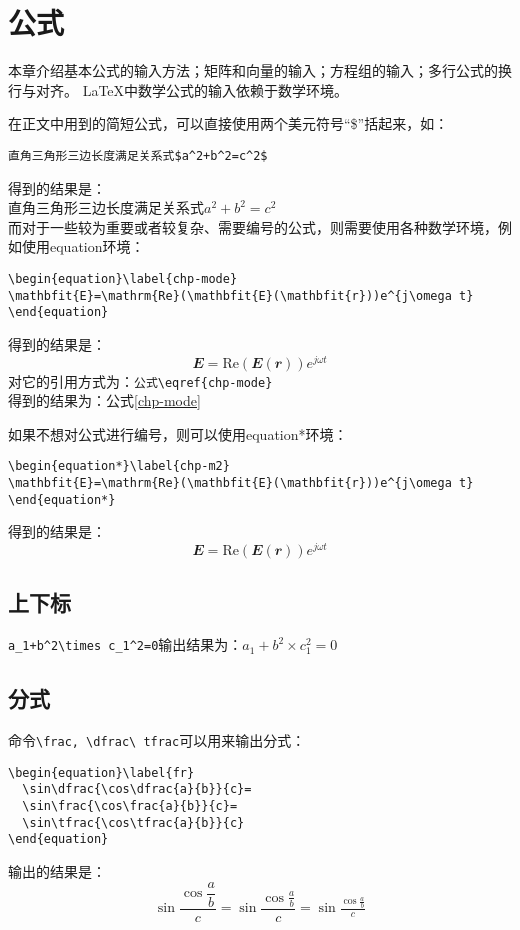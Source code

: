 \chapter{公式}
\label{chap:equ}
本章介绍基本公式的输入方法；矩阵和向量的输入；方程组的输入；多行公式的换行与对齐。
\LaTeX 中数学公式的输入依赖于数学环境。

在正文中用到的简短公式，可以直接使用两个美元符号“\$”括起来，如：
\begin{verbatim}
直角三角形三边长度满足关系式$a^2+b^2=c^2$
\end{verbatim}
得到的结果是：\\
直角三角形三边长度满足关系式$a^2+b^2=c^2$\\

而对于一些较为重要或者较复杂、需要编号的公式，则需要使用各种数学环境，例如使用equation环境：
\begin{verbatim}
\begin{equation}\label{chp-mode}
\mathbfit{E}=\mathrm{Re}(\mathbfit{E}(\mathbfit{r}))e^{j\omega t}
\end{equation}
\end{verbatim}
得到的结果是：
\begin{equation}\label{chp-mode}
\mathbfit{E}=\mathrm{Re}(\mathbfit{E}(\mathbfit{r}))e^{j\omega t}
\end{equation}
对它的引用方式为：\verb|公式\eqref{chp-mode}|\\
得到的结果为：公式\eqref{chp-mode}

如果不想对公式进行编号，则可以使用equation*环境：
\begin{verbatim}
\begin{equation*}\label{chp-m2}
\mathbfit{E}=\mathrm{Re}(\mathbfit{E}(\mathbfit{r}))e^{j\omega t}
\end{equation*}
\end{verbatim}
得到的结果是：
\begin{equation*}\label{chp-m2}
\mathbfit{E}=\mathrm{Re}(\mathbfit{E}(\mathbfit{r}))e^{j\omega t}
\end{equation*}

\section{上下标}
\verb|a_1+b^2\times c_1^2=0|输出结果为：$a_1+b^2\times c_1^2=0$

\section{分式}
命令\verb|\frac, \dfrac\ tfrac|可以用来输出分式：
\begin{verbatim}
\begin{equation}\label{fr}
  \sin\dfrac{\cos\dfrac{a}{b}}{c}=
  \sin\frac{\cos\frac{a}{b}}{c}=
  \sin\tfrac{\cos\tfrac{a}{b}}{c}
\end{equation}
\end{verbatim}
输出的结果是：
\begin{equation}\label{fr}
\sin\dfrac{\cos\dfrac{a}{b}}{c}=
\sin\frac{\cos\frac{a}{b}}{c}=
\sin\tfrac{\cos\tfrac{a}{b}}{c}
\end{equation}

